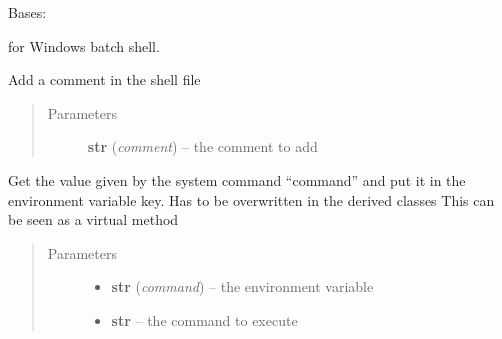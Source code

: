 \documentclass[a4paper,10pt,english]{sphinxmanual}
\begin{document}
\begin{fulllineitems}
\label{commands/apidoc/src:src.fileEnviron.BatFileEnviron}
Bases: {\hyperref[commands/apidoc/src:src.fileEnviron.FileEnviron]{}}

for Windows batch shell.

\begin{fulllineitems}
\label{commands/apidoc/src:src.fileEnviron.BatFileEnviron.add_comment}
Add a comment in the shell file
\begin{quote}\begin{description}
\item[{Parameters}] \leavevmode
\textbf{str} (\emph{comment}) -- the comment to add

\end{description}\end{quote}

\end{fulllineitems}


\begin{fulllineitems}
\label{commands/apidoc/src:src.fileEnviron.BatFileEnviron.command_value}
Get the value given by the system command ``command'' 
and put it in the environment variable key.
Has to be overwritten in the derived classes
This can be seen as a virtual method
\begin{quote}\begin{description}
\item[{Parameters}] \leavevmode\begin{itemize}
\item {} 
\textbf{str} (\emph{command}) -- the environment variable

\item {} 
\textbf{str} -- the command to execute

\end{itemize}

\end{description}\end{quote}

\end{fulllineitems}


\end{fulllineitems}
\end{document}
